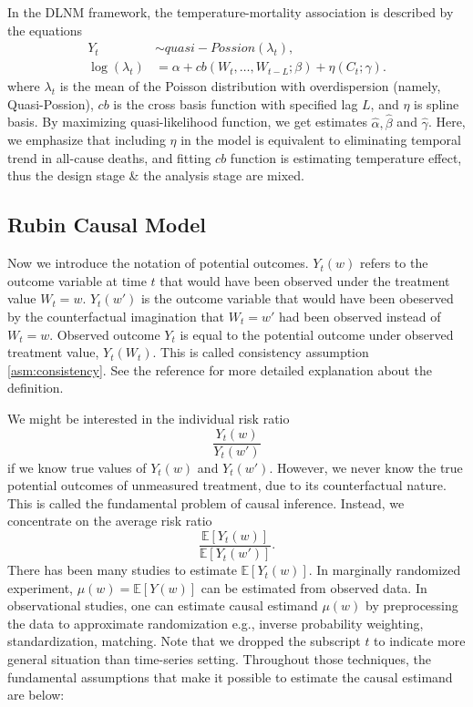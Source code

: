 \documentclass[12pt]{article}
\begin{document}
In the DLNM framework,
the temperature-mortality association is described by the equations
\[
	\begin{split}
		Y_t &\sim quasi-Possion(\lambda_t), \\
		\log(\lambda_t) &= \alpha + cb(W_t, \dots, W_{t-L};\beta) + \eta(C_t; \gamma).
	\end{split}
\]
where $\lambda_t$ is the mean of 
the Poisson distribution with overdispersion (namely, Quasi-Possion\cite{quasipoisson}),
$cb$ is the cross basis function with specified lag $L$,
and $\eta$ is spline basis.
By maximizing quasi-likelihood function, 
we get estimates $\hat{\alpha}, \hat{\beta}$ and $\hat{\gamma}$.
Here, we emphasize that 
including $\eta$ in the model is equivalent to eliminating temporal trend in all-cause deaths,
and fitting $cb$ function is estimating temperature effect,
thus the design stage \& the analysis stage are mixed.





\subsection{Rubin Causal Model}
\label{section:rcm}

Now we introduce the notation of potential outcomes.
$Y_t(w)$ refers to the outcome variable at time $t$
that would have been observed under the treatment value $W_t = w$.
$Y_t(w')$ is the outcome variable that would have been obeserved by the counterfactual imagination
that $W_t = w'$ had been observed instead of $W_t = w$.
Observed outcome $Y_t$ is equal to the potential outcome under observed treatment value, $Y_t(W_t)$.
This is called consistency assumption \ref{asm:consistency}.
See the reference\cite{whatif2020} for more detailed explanation about the definition.

We might be interested in the individual risk ratio
\[
	\frac{Y_t(w)}{Y_t(w')}
\]
if we know true values of $Y_t(w)$ and $Y_t(w')$.
However, we never know the true potential outcomes of unmeasured treatment, 
due to its counterfactual nature.
This is called the fundamental problem of causal inference\cite{holland1986}.
Instead, we concentrate on the average risk ratio
\[
	\frac{\mathbb{E}\left[ Y_t(w) \right]}{\mathbb{E}\left[ Y_t(w') \right]}.
\]
There has been many studies to estimate $\mathbb{E}[Y_t(w)]$.
In marginally randomized experiment, 
$\mu(w) = \mathbb{E}[Y(w)]$ can be estimated from observed data\cite{rubin1974}.
In observational studies, 
one can estimate causal estimand $\mu(w)$ by preprocessing the data to approximate randomization 
e.g., inverse probability weighting, standardization, matching\cite{rosenbaum1983}.
Note that we dropped the subscript $t$ to indicate more general situation than time-series setting.
Throughout those techniques, 
the fundamental assumptions that make it possible to estimate the causal estimand are below:
\end{document}
